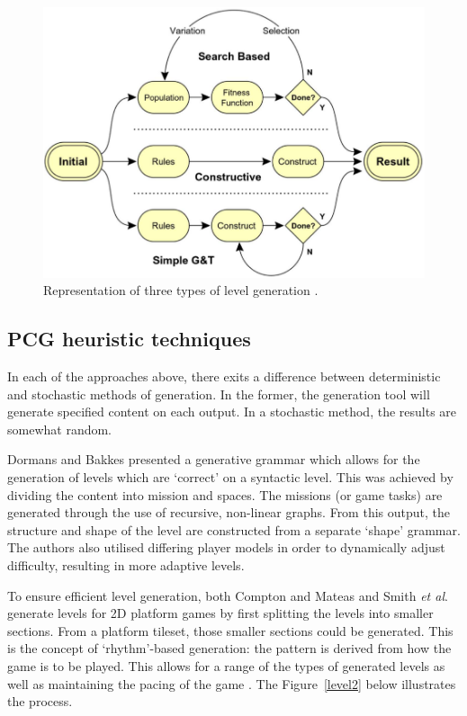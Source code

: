 \documentclass[11pt, a4paper, oneside]{report} %
\begin{document}
\begin{figure}[h!]
  
  \centering
    \includegraphics[scale=0.35]{lvlgenmethods}
  \caption{Representation of three types of level generation \cite{5756645}.}
  \label{level}
\end{figure}


\subsection{PCG heuristic techniques}

In each of the approaches above, there exits a difference between deterministic and stochastic
methods of generation. In the former, the generation tool will generate specified content on each
output. In a stochastic method, the results are somewhat random. 

Dormans and Bakkes \@\cite{dormans2011generating} presented a generative grammar which allows for
the generation of levels which are `correct' on a syntactic level. This was achieved by dividing the
content into mission and spaces. The missions (or game tasks) are generated through the use of
recursive, non-linear graphs. From this output, the structure and shape of the level are constructed
from a separate `shape' grammar. The authors also utilised differing player models in order to
dynamically adjust difficulty, resulting in more adaptive levels.


To ensure efficient level generation, both Compton and Mateas \cite{compton2006procedural} and
Smith \textit{et al}. \cite{Smith:2009:RLG:1536513.1536548} generate levels for 2D platform games by
first splitting the levels into smaller sections. From a platform tileset, those smaller sections
could be generated. This is the concept of `rhythm'-based generation: the pattern is derived from
how the game is to be played. This allows for a range of the types of generated levels as well as
maintaining the pacing of the game \cite{Smith:2009:RLG:1536513.1536548}. The Figure~\ref{level2} below
illustrates the process. 
\end{document}

